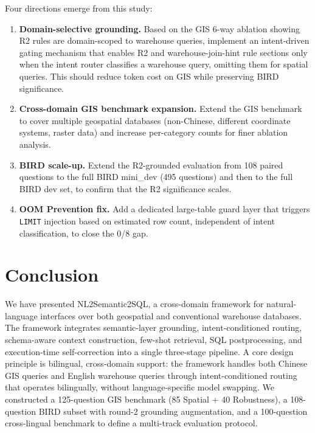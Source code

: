 \documentclass[11pt]{article}
\begin{document}
Four directions emerge from this study:
\begin{enumerate}[leftmargin=*]
  \item \textbf{Domain-selective grounding.} Based on the GIS 6-way ablation showing R2 rules are domain-scoped to warehouse queries, implement an intent-driven gating mechanism that enables R2 and warehouse-join-hint rule sections only when the intent router classifies a warehouse query, omitting them for spatial queries. This should reduce token cost on GIS while preserving BIRD significance.
  \item \textbf{Cross-domain GIS benchmark expansion.} Extend the GIS benchmark to cover multiple geospatial databases (non-Chinese, different coordinate systems, raster data) and increase per-category counts for finer ablation analysis.
  \item \textbf{BIRD scale-up.} Extend the R2-grounded evaluation from 108 paired questions to the full BIRD mini\_dev (495 questions) and then to the full BIRD dev set, to confirm that the R2 significance scales.
  \item \textbf{OOM Prevention fix.} Add a dedicated large-table guard layer that triggers \texttt{LIMIT} injection based on estimated row count, independent of intent classification, to close the 0/8 gap.
\end{enumerate}

\section{Conclusion}
\label{sec:conclusion}

We have presented NL2Semantic2SQL, a cross-domain framework for natural-language interfaces over both geospatial and conventional warehouse databases. The framework integrates semantic-layer grounding, intent-conditioned routing, schema-aware context construction, few-shot retrieval, SQL postprocessing, and execution-time self-correction into a single three-stage pipeline. A core design principle is bilingual, cross-domain support: the framework handles both Chinese GIS queries and English warehouse queries through intent-conditioned routing that operates bilingually, without language-specific model swapping. We constructed a 125-question GIS benchmark (85 Spatial + 40 Robustness), a 108-question BIRD subset with round-2 grounding augmentation, and a 100-question cross-lingual benchmark to define a multi-track evaluation protocol.
\end{document}
